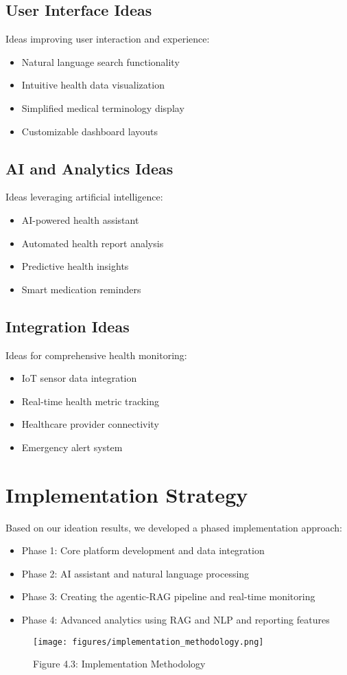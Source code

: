 \subsection{User Interface Ideas}
Ideas improving user interaction and experience:
\begin{itemize}
    \item Natural language search functionality
    \item Intuitive health data visualization
    \item Simplified medical terminology display
    \item Customizable dashboard layouts
\end{itemize}

\subsection{AI and Analytics Ideas}
Ideas leveraging artificial intelligence:
\begin{itemize}
    \item AI-powered health assistant
    \item Automated health report analysis
    \item Predictive health insights
    \item Smart medication reminders
\end{itemize}

\subsection{Integration Ideas}
Ideas for comprehensive health monitoring:
\begin{itemize}
    \item IoT sensor data integration
    \item Real-time health metric tracking
    \item Healthcare provider connectivity
    \item Emergency alert system
\end{itemize}

\section{Implementation Strategy}
Based on our ideation results, we developed a phased implementation approach:

\begin{itemize}
    \item Phase 1: Core platform development and data integration
    \item Phase 2: AI assistant and natural language processing
    \item Phase 3: Creating the agentic-RAG pipeline and real-time monitoring
    \item Phase 4: Advanced analytics using RAG and NLP and reporting features
\end{itemize}

\begin{figure}[H]
    \centering
    \texttt{[image: figures/implementation\_methodology.png]}
    \caption{Figure 4.3: Implementation Methodology}
\end{figure} 